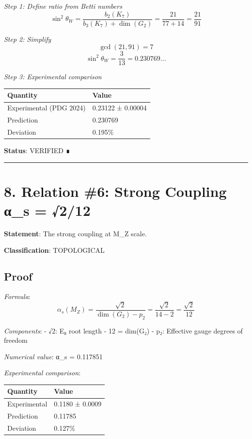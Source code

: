\documentclass[11pt,a4paper]{article}
\begin{document}
\emph{Step 1: Define ratio from Betti numbers} \[\sin^2\theta_W = \frac{b_2(K_7)}{b_3(K_7) + \dim(G_2)} = \frac{21}{77 + 14} = \frac{21}{91}\]

\emph{Step 2: Simplify} \[\gcd(21, 91) = 7\] \[\sin^2\theta_W = \frac{3}{13} = 0.230769...\]

\emph{Step 3: Experimental comparison}

\begin{longtable}[]{@{}ll@{}}
\toprule\noalign{}
Quantity & Value \\
\midrule\noalign{}
\endhead
\bottomrule\noalign{}
\endlastfoot
Experimental (PDG 2024) & 0.23122 ± 0.00004 \\
Prediction & 0.230769 \\
Deviation & 0.195\% \\
\end{longtable}

\textbf{Status}: VERIFIED ∎

\begin{center}\rule{\linewidth}{0.5pt}\end{center}

\section{8. Relation \#6: Strong Coupling α\_\allowbreak{}s = √2/12}\label{relation-6-strong-coupling-ux3b1_s-212}

\textbf{Statement}: The strong coupling at M\_\allowbreak{}Z scale.

\textbf{Classification}: TOPOLOGICAL

\subsection{Proof}\label{proof-4}

\emph{Formula}: \[\alpha_s(M_Z) = \frac{\sqrt{2}}{\dim(G_2) - p_2} = \frac{\sqrt{2}}{14 - 2} = \frac{\sqrt{2}}{12}\]

\emph{Components}: - √2: E₈ root length - 12 = dim(G₂) - p₂: Effective gauge degrees of freedom

\emph{Numerical value}: α\_\allowbreak{}s = 0.117851

\emph{Experimental comparison}:

\begin{longtable}[]{@{}ll@{}}
\toprule\noalign{}
Quantity & Value \\
\midrule\noalign{}
\endhead
\bottomrule\noalign{}
\endlastfoot
Experimental & 0.1180 ± 0.0009 \\
Prediction & 0.11785 \\
Deviation & 0.127\% \\
\end{longtable}
\end{document}
